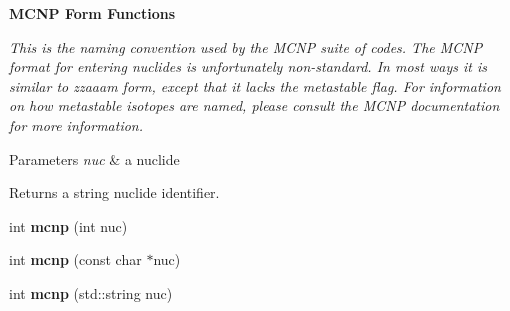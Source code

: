 \begin{Indent}{\bf M\+C\+NP Form Functions}\par
{\em This is the naming convention used by the M\+C\+NP suite of codes. The M\+C\+NP format for entering nuclides is unfortunately non-\/standard. In most ways it is similar to zzaaam form, except that it lacks the metastable flag. For information on how metastable isotopes are named, please consult the M\+C\+NP documentation for more information. 
\begin{DoxyParams}{Parameters}
{\em nuc} & a nuclide \\
\hline
\end{DoxyParams}
\begin{DoxyReturn}{Returns}
a string nuclide identifier. 
\end{DoxyReturn}
}\begin{DoxyCompactItemize}
\item 
int {\bfseries mcnp} (int nuc)\hypertarget{namespacepyne_1_1nucname_a9b336037f24de5fb0a9f24bc6324cd40}{}\label{namespacepyne_1_1nucname_a9b336037f24de5fb0a9f24bc6324cd40}

\item 
int {\bfseries mcnp} (const char $\ast$nuc)\hypertarget{namespacepyne_1_1nucname_aa2134eda4b5151d6299fd682122d89e3}{}\label{namespacepyne_1_1nucname_aa2134eda4b5151d6299fd682122d89e3}

\item 
int {\bfseries mcnp} (std\+::string nuc)\hypertarget{namespacepyne_1_1nucname_a3e05db49bed60a40e56a1798afcd33ea}{}\label{namespacepyne_1_1nucname_a3e05db49bed60a40e56a1798afcd33ea}

\end{DoxyCompactItemize}
\end{Indent}
